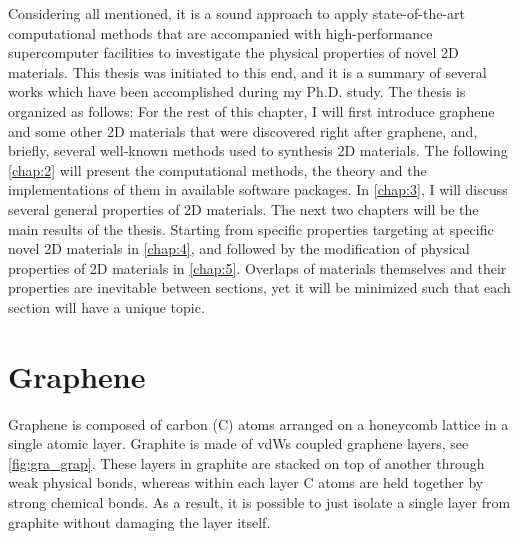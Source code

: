 Considering all mentioned, it is a sound approach to apply state-of-the-art computational methods that are accompanied with high-performance supercomputer facilities to investigate the physical properties of novel 2D materials. This thesis was initiated to this end, and it is a summary of several works which have been accomplished during my Ph.D. study. The thesis is organized as follows: For the rest of this chapter, I will first introduce graphene and some other 2D materials that were discovered right after graphene, and, briefly, several well-known methods used to synthesis 2D materials. The following \autoref{chap:2} will present the computational methods, the theory and the implementations of them in available software packages. In \autoref{chap:3}, I will discuss several general properties of 2D materials. The next two chapters will be the main results of the thesis. Starting from specific properties targeting at specific novel 2D materials in \autoref{chap:4}, and followed by the modification of physical properties of 2D materials in \autoref{chap:5}. Overlaps of materials themselves and their properties are inevitable between sections, yet it will be minimized such that each section will have a unique topic. 



\section{Graphene}

Graphene is composed of carbon (C) atoms arranged on a honeycomb lattice in a single atomic layer. Graphite is made of vdWs coupled graphene layers, see \autoref{fig:gra_grap}. These layers in graphite are stacked on top of another through weak physical bonds, whereas within each layer C atoms are held together by strong chemical bonds. As a result, it is possible to just isolate a single layer from graphite without damaging the layer itself. 

